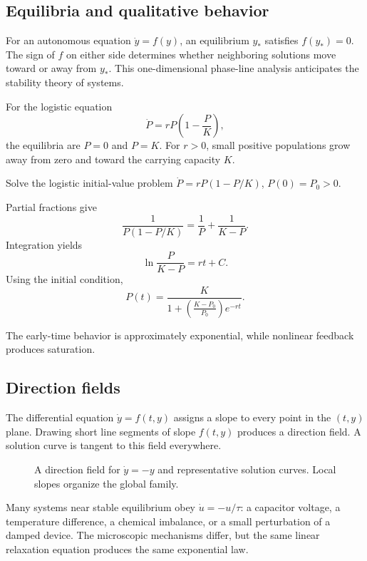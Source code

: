 \subsection{Equilibria and qualitative behavior}
For an autonomous equation $\dot y=f(y)$, an equilibrium $y_*$ satisfies $f(y_*)=0$. The sign of $f$ on either side determines whether neighboring solutions move toward or away from $y_*$. This one-dimensional phase-line analysis anticipates the stability theory of systems.

For the logistic equation
\[
\dot P=rP\left(1-\frac{P}{K}\right),
\]
the equilibria are $P=0$ and $P=K$. For $r>0$, small positive populations grow away from zero and toward the carrying capacity $K$.

\begin{workedexample}
Solve the logistic initial-value problem $\dot P=rP(1-P/K)$, $P(0)=P_0>0$.
\begin{solution}
Partial fractions give
\[
\frac{1}{P(1-P/K)}=\frac{1}{P}+\frac{1}{K-P}.
\]
Integration yields
\[
\ln\frac{P}{K-P}=rt+C.
\]
Using the initial condition,
\[
\boxed{P(t)=\frac{K}{1+\left(\frac{K-P_0}{P_0}\right)e^{-rt}}}.
\]
\end{solution}
The early-time behavior is approximately exponential, while nonlinear feedback produces saturation.
\end{workedexample}

\subsection{Direction fields}
The differential equation $\dot y=f(t,y)$ assigns a slope to every point in the $(t,y)$ plane. Drawing short line segments of slope $f(t,y)$ produces a direction field. A solution curve is tangent to this field everywhere.

\begin{figure}[htbp]
\centering

\caption{A direction field for $\dot y=-y$ and representative solution curves. Local slopes organize the global family.}
\label{fig:ch4-slope-field}
\end{figure}

\begin{physicalbox}
Many systems near stable equilibrium obey $\dot u=-u/\tau$: a capacitor voltage, a temperature difference, a chemical imbalance, or a small perturbation of a damped device. The microscopic mechanisms differ, but the same linear relaxation equation produces the same exponential law.
\end{physicalbox}
